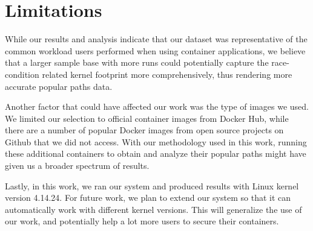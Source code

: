 \section{Limitations}
\label{sec.limitation}
While our results and analysis indicate that our dataset was representative of the common workload users performed when using container applications, 
we believe that a larger sample base with more runs could potentially capture the race-condition related kernel footprint more comprehensively, thus rendering more accurate popular paths data. 

Another factor that could have affected our work was the type of images we used. 
We limited our selection to official container images from Docker Hub, while there are a number of popular Docker images from open source projects on Github that we did not access. 
With our methodology used in this work, running these additional containers to obtain and analyze their popular paths might have given us a broader spectrum of results.

Lastly, in this work, we ran our system and produced results with Linux kernel version 4.14.24. 
For future work, we plan to extend our system so that it can automatically work with different kernel versions. 
This will generalize the use of our work, and potentially help a lot more users to secure their containers. 